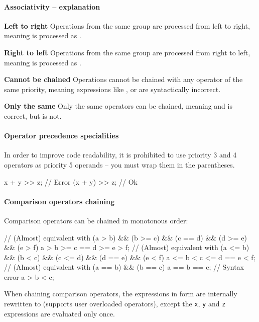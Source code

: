 \paragraph{Associativity -- explanation}
\begin{compactitem}
	\item \textbf{Left to right} Operations from the same group are processed from left to right, meaning  is processed as .
	\item \textbf{Right to left} Operations from the same group are processed from right to left, meaning  is processed as .
	\item \textbf{Cannot be chained} Operations cannot be chained with any operator of the same priority, meaning expressions like ,  or  are syntactically incorrect.
	\item \textbf{Only the same} Only the same operators can be chained, meaning  and  is correct, but  is not.
\end{compactitem}

\paragraph{Operator precedence specialities}
In order to improve code readability, it is prohibited to use priority 3 and 4 operators as priority 5 operands -- you must wrap them in the parentheses.
\begin{code}
x + y >> z; // Error
(x + y) >> z; // Ok
\end{code}

\paragraph{Comparison operators chaining} Comparison operators can be chained in monotonous order:
\begin{code}
// (Almost) equivalent with (a > b) && (b >= c) && (c == d) && (d >= e) && (e > f)
a > b >= c == d >= e > f;
// (Almost) equivalent with (a <= b) && (b < c) && (c <= d) && (d == e) && (e < f)
a <= b < c <= d == e < f;
// (Almost) equivalent with (a == b) && (b == c)
a == b == c;
// Syntax error
a > b < c;
\end{code}

When chaining comparison operators, the expressions in form  are internally rewritten to  (supports user overloaded operators), except the \verb|x|, \verb|y| and \verb|z| expressions are evaluated only once.

